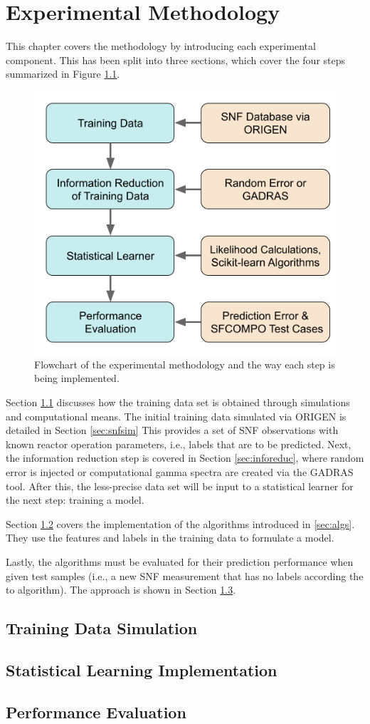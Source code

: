 \chapter{Experimental Methodology}
\label{ch:method}

This chapter covers the methodology by introducing each experimental component.
This has been split into three sections, which cover the four steps summarized
in Figure \ref{fig:method}.

\begin{figure}[!ht]
  \centering
  \includegraphics[width=0.7\linewidth]{./chapters/method/methodology.png}
  \caption{Flowchart of the experimental methodology and the way each step is being implemented.}
  \label{fig:method}
\end{figure}

Section \ref{sec:training} discusses how the training data set is obtained
through simulations and computational means. The initial training data
simulated via \gls{ORIGEN} is detailed in Section \ref{sec:snfsim} This
provides a set of \gls{SNF} observations with known reactor operation
parameters, i.e., labels that are to be predicted.  Next, the information
reduction step is covered in Section \ref{sec:inforeduc}, where random error is
injected or computational gamma spectra are created via the \gls{GADRAS} tool.
After this, the less-precise data set will be input to a statistical learner
for the next step: training a model.

Section \ref{sec:statmodel} covers the implementation of the algorithms
introduced in \ref{sec:algs}. They use the features and labels in the training
data to formulate a model.  

Lastly, the algorithms must be evaluated for their prediction performance when
given test samples (i.e., a new \gls{SNF} measurement that has no labels
according the to algorithm).  The approach is shown in Section \ref{sec:eval}. 

\section{Training Data Simulation}
\label{sec:training}


\section{Statistical Learning Implementation}
\label{sec:statmodel}


\section{Performance Evaluation}
\label{sec:eval}

